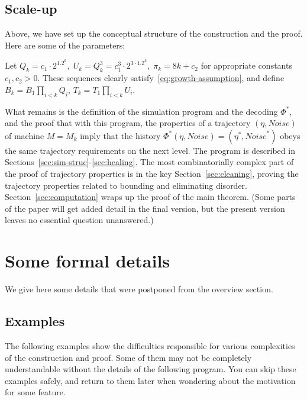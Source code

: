 \documentclass[11pt]{memoir}
\theoremstyle{definition} %
\def\B{B}
\def\U{U}
\newcommand{\Noise}{\mathit{Noise}}
\newcommand{\passno}{\pi}
\newcommand{\Q}{Q} %
\newcommand{\Tu}{T}
\begin{document}
\subsection{Scale-up}

Above, we have set up the conceptual structure of the construction and the proof.
Here are some of the parameters: 

\begin{definition}\label{def:hier-params}
  Let
  \(
   \Q_{k}=c_{1}\cdot 2^{1.2^{k}},\;
   \U_{k} = \Q_{k}^{3}=c_{1}^{3}\cdot 2^{3\cdot 1.2^{k}},\;
   \passno_{k}=8 k + c_{2}
\)
for appropriate constants \( c_{1},c_{2}>0 \).
 These sequences clearly satisfy~\eqref{eq:growth-assumption}, and
 define \( \B_{k}=\B_{1}\prod_{i<k}\Q_{i} \), 
 \( \Tu_{k}=\Tu_{1}\prod_{i<k}\U_{i} \).
\end{definition}

What remains is the definition of the simulation program and the decoding \( \Phi^{*} \),
and the proof that with this
program, the properties of a trajectory \( (\eta,\Noise) \) of machine \( M=M_{k} \) imply
that the history \( \Phi^{*}(\eta,\Noise)=(\eta^{*},\Noise^{*}) \) obeys the same trajectory
requirements on the next level.
The program is described in Sections~\ref{sec:sim-struc}-\ref{sec:healing}.
The most combinatorially complex part of the proof of trajectory properties
is in the key Section~\ref{sec:cleaning}, proving the trajectory properties related to bounding and
eliminating disorder.
Section~\ref{sec:computation} wraps up the proof of the main theorem.
(Some parts of the paper will get added detail in the final version, but the present version
leaves no essential question unanswered.)

\newpage


\section{Some formal details}

We give here some details that were postponed from the overview section.

\subsection{Examples}\label{sec:examples}

The following examples show the difficulties responsible for various complexities of the
construction and proof.
Some of them may not be completely understandable without the details of the following program.
You can skip these examples safely, and return to them later when wondering
about the motivation for some feature.
\end{document}
